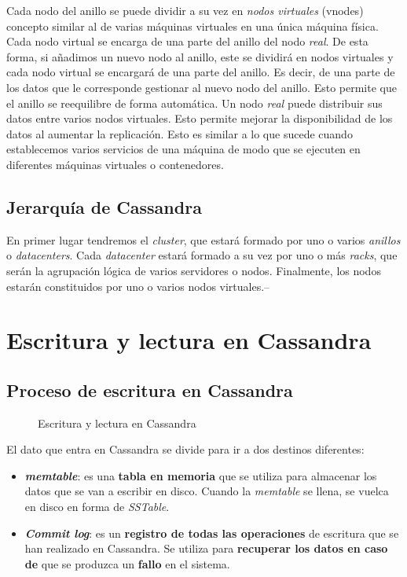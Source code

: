\documentclass[
]{book}
\providecommand{\tightlist}{%
  \setlength{\itemsep}{0pt}\setlength{\parskip}{0pt}}
\begin{document}
Cada nodo del anillo se puede dividir a su vez en \emph{nodos virtuales} (vnodes) concepto similar al de varias máquinas virtuales en una única máquina física. Cada nodo virtual se encarga de una parte del anillo del nodo \emph{real}. De esta forma, si añadimos un nuevo nodo al anillo, este se dividirá en nodos virtuales y cada nodo virtual se encargará de una parte del anillo. Es decir, de una parte de los datos que le corresponde gestionar al nuevo nodo del anillo. Esto permite que el anillo se reequilibre de forma automática. Un nodo \emph{real} puede distribuir sus datos entre varios nodos virtuales. Esto permite mejorar la disponibilidad de los datos al aumentar la replicación. Esto es similar a lo que sucede cuando establecemos varios servicios de una máquina de modo que se ejecuten en diferentes máquinas virtuales o contenedores.

\subsection{Jerarquía de Cassandra}\label{jerarquuxeda-de-cassandra}

En primer lugar tendremos el \emph{cluster}, que estará formado por uno o varios \emph{anillos} o \emph{datacenters}. Cada \emph{datacenter} estará formado a su vez por uno o más \emph{racks}, que serán la agrupación lógica de varios servidores o nodos. Finalmente, los nodos estarán constituidos por uno o varios nodos virtuales.--

\section{Escritura y lectura en Cassandra}\label{escritura-y-lectura-en-cassandra}

\subsection{Proceso de escritura en Cassandra}\label{proceso-de-escritura-en-cassandra}

\begin{figure}
\centering

\caption{Escritura y lectura en Cassandra}
\end{figure}

El dato que entra en Cassandra se divide para ir a dos destinos diferentes:

\begin{itemize}
\tightlist
\item
  \textbf{\emph{memtable}}: es una \textbf{tabla en memoria} que se utiliza para almacenar los datos que se van a escribir en disco. Cuando la \emph{memtable} se llena, se vuelca en disco en forma de \emph{SSTable}.
\item
  \textbf{\emph{Commit log}}: es un \textbf{registro de todas las operaciones} de escritura que se han realizado en Cassandra. Se utiliza para \textbf{recuperar los datos en caso de} que se produzca un \textbf{fallo} en el sistema.
\end{itemize}
\end{document}
